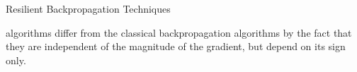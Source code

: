 \begin{chapter}{Resilient Backpropagation Techniques}
    \par {} algorithms differ from the classical backpropagation algorithms by the fact that they are independent of the magnitude of the gradient, but depend on its sign only.
    
    
\end{chapter}